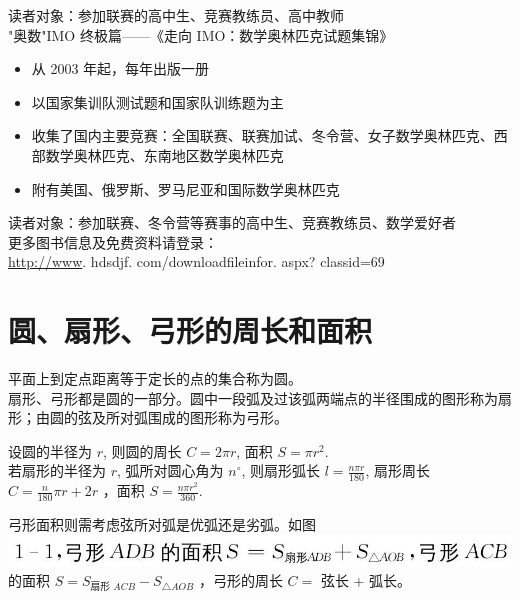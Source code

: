 \documentclass[10pt]{article}
\begin{document}
读者对象：参加联赛的高中生、竞赛教练员、高中教师\\
"奥数"IMO 终极篇——《走向 IMO：数学奥林匹克试题集锦》

\begin{itemize}
  \item 从 2003 年起，每年出版一册
  \item 以国家集训队测试题和国家队训练题为主
  \item 收集了国内主要竞赛：全国联赛、联赛加试、冬令营、女子数学奥林匹克、西部数学奥林匹克、东南地区数学奥林匹克
  \item 附有美国、俄罗斯、罗马尼亚和国际数学奥林匹克
\end{itemize}

读者对象：参加联赛、冬令营等赛事的高中生、竞赛教练员、数学爱好者\\
更多图书信息及免费资料请登录：\\
\href{http://www}{http://www}. hdsdjf. com/downloadfileinfor. aspx? classid=69

\section*{圆、扇形、弓形的周长和面积}
平面上到定点距离等于定长的点的集合称为圆。\\
扇形、弓形都是圆的一部分。圆中一段弧及过该弧两端点的半径围成的图形称为扇形；由圆的弦及所对弧围成的图形称为弓形。

设圆的半径为 $r$, 则圆的周长 $C=2 \pi r$, 面积 $S=\pi r^{2}$.\\
若扇形的半径为 $r$, 弧所对圆心角为 $n^{\circ}$, 则扇形弧长 $l=\frac{n \pi r}{180}$, 扇形周长 $C=\frac{n}{180} \pi r+2 r$ ，面积 $S=\frac{n \pi r^{2}}{360}$.

弓形面积则需考虑弦所对弧是优弧还是劣弧。如图\\
\includegraphics[max width=\textwidth]{2024_10_30_66b8e5e701da2093c133g-011(1)}的面积 $S=S_{\text {扇形 } A C B}-S_{\triangle A O B}$ ，弓形的周长 $C=$ 弦长 + 弧长。
\end{document}
